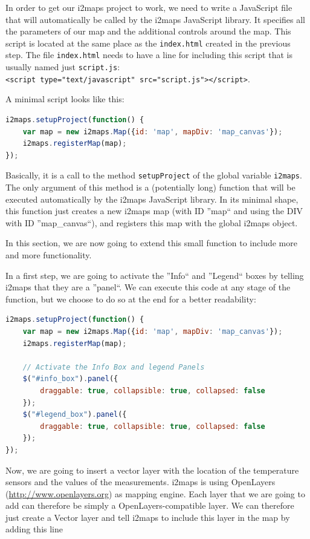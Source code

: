 \documentclass[11pt]{article}
\begin{document}
In order to get our i2maps project to work, we need to write a JavaScript file that will automatically be called by the i2maps JavaScript library. It specifies all the parameters of our map and the additional controls around the map. This script is located at the same place as the \texttt{index.html} created in the previous step. The file \texttt{index.html} needs to have a line for including this script that is usually named just \texttt{script.js}: \\
\texttt{<script type="text/javascript" src="script.js"></script>}.

A minimal script looks like this:
\begin{lstlisting}[language=JavaScript]
i2maps.setupProject(function() {
	var map = new i2maps.Map({id: 'map', mapDiv: 'map_canvas'});
	i2maps.registerMap(map);
});
\end{lstlisting}

Basically, it is a call to the method \texttt{setupProject} of the global variable \texttt{i2maps}. The only argument of this method is a (potentially long) function that will be executed automatically by the i2maps JavaScript library. In its minimal shape, this function just creates a new i2maps map (with ID ''map`` and using the DIV with ID ''map\_canvas``), and registers this map with the global i2maps object.

In this section, we are now going to extend this small function to include more and more functionality.

In a first step, we are going to activate the ''Info`` and ''Legend`` boxes by telling i2maps that they are a ''panel``. We can execute this code at any stage of the function, but we choose to do so at the end for a better readability:

\begin{lstlisting}[language=JavaScript]
i2maps.setupProject(function() {
	var map = new i2maps.Map({id: 'map', mapDiv: 'map_canvas'});
	i2maps.registerMap(map);
	
	// Activate the Info Box and legend Panels
	$("#info_box").panel({
		draggable: true, collapsible: true, collapsed: false
	});
	$("#legend_box").panel({
		draggable: true, collapsible: true, collapsed: false
	});
});
\end{lstlisting}

Now, we are going to insert a vector layer with the location of the temperature sensors and the values of the measurements. i2maps is using OpenLayers (\url{http://www.openlayers.org}) as mapping engine. Each layer that we are going to add can therefore be simply a OpenLayers-compatible layer. We can therefore just create a Vector layer and tell i2maps to include this layer in the map by adding this line
\end{document}
